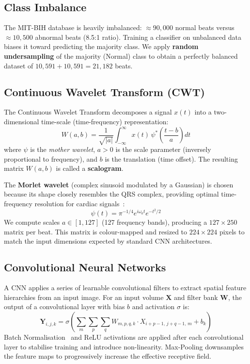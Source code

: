 \documentclass[12pt,a4paper]{article}
\begin{document}
\subsection{Class Imbalance}

The MIT-BIH database is heavily imbalanced: $\approx 90{,}000$ normal beats
versus $\approx 10{,}500$ abnormal beats (8.5:1 ratio).  Training a classifier
on unbalanced data biases it toward predicting the majority class.  We apply
\textbf{random undersampling} of the majority (Normal) class to obtain a
perfectly balanced dataset of $10{,}591 + 10{,}591 = 21{,}182$ beats.

\subsection{Continuous Wavelet Transform (CWT)}

The Continuous Wavelet Transform decomposes a signal $x(t)$ into a
two-dimensional time-scale (time-frequency) representation:
\begin{equation}
    W(a, b) = \frac{1}{\sqrt{|a|}} \int_{-\infty}^{\infty}
              x(t)\,\psi^*\!\left(\frac{t - b}{a}\right) dt
    \label{eq:cwt}
\end{equation}
where $\psi$ is the \emph{mother wavelet}, $a > 0$ is the scale parameter
(inversely proportional to frequency), and $b$ is the translation (time offset).
The resulting matrix $W(a, b)$ is called a \textbf{scalogram}.

The \textbf{Morlet wavelet} (complex sinusoid modulated by a Gaussian) is
chosen because its shape closely resembles the QRS complex, providing optimal
time-frequency resolution for cardiac signals~\cite{addison2005wavelet}:
\begin{equation}
    \psi(t) = \pi^{-1/4} e^{i\omega_0 t} e^{-t^2/2}
    \label{eq:morlet}
\end{equation}
We compute scales $a \in [1, 127]$ (127 frequency bands), producing a
$127 \times 250$ matrix per beat.  This matrix is colour-mapped and resized to
$224 \times 224$ pixels to match the input dimensions expected by standard CNN
architectures.

\subsection{Convolutional Neural Networks}

A CNN applies a series of learnable convolutional filters to extract spatial
feature hierarchies from an input image.  For an input volume $\mathbf{X}$ and
filter bank $\mathbf{W}$, the output of a convolutional layer with bias $b$ and
activation $\sigma$ is:
\begin{equation}
    \mathbf{Y}_{i,j,k} = \sigma\!\left(
        \sum_{m}\sum_{p}\sum_{q} W_{m,p,q,k} \cdot X_{i+p-1,\, j+q-1,\, m}
        + b_k \right)
    \label{eq:conv}
\end{equation}
Batch Normalisation~\cite{ioffe2015batchnorm} and ReLU activations are applied
after each convolutional layer to stabilise training and introduce
non-linearity.  Max-Pooling downsamples the feature maps to progressively
increase the effective receptive field.
\end{document}

